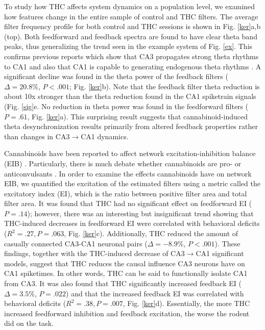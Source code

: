 \documentclass[11pt,a4paper,final]{article}
\begin{document}
To study how THC affects system dynamics on a population level, we examined how features change in the entire sample of control and THC filters.
The average filter frequency profile for both control and THC sessions is shown in Fig. \ref{ker}a,b (top).
Both feedforward and feedback spectra are found to have clear theta band peaks, thus generalizing the trend seen in the example system of Fig. \ref{ex}.
This confirms previous reports which show that CA3 propagates strong theta rhythms to CA1 \citep{kocsis99,buzsaki02} and also that CA1 is capable to generating endogenous theta rhythms \citep{williams09}.
A significant decline was found in the theta power of the feedback filters ($\Delta=20.8\%$, $P<.001$; Fig. \ref{ker}b).
Note that the feedback filter theta reduction is about 10x stronger than the theta reduction found in the CA1 spiketrain signals (Fig. \ref{sig}e.
No reduction in theta power was found in the feedforward filters ($P=.61$, Fig. \ref{ker}a).
This surprising result suggests that cannabinoid-induced theta desynchronization results primarily from altered feedback properties rather than changes in CA3$\to$CA1 dynamics.

Cannabinoids have been reported to affect network excitation-inhibition balance (EIB) \citep{ozaita12,monory15}.
Particularly, there is much debate whether cannabinoids are pro- or anticonvulsants \citep{hill13,turkanis82,clement03,blair06,rudenko12}.
In order to examine the effects cannabinoids have on network EIB, we quantified the excitation of the estimated filters using a metric called the excitatory index (EI), which is the ratio between positive filter area and total filter area.
It was found that THC had no significant effect on feedforward EI ($P=.14$); however, there was an interesting but insignificant trend showing that THC-induced decreases in feedforward EI were correlated with behavioral deficits ($R^2=.27, P=.063$, Fig. \ref{ker}c).
Additionally, THC reduced the amount of casually connected CA3-CA1 neuronal pairs ($\Delta=-8.9\%$, $P<.001$).
These findings, together with the THC-induced decrease of CA3$\to$CA1 significant models, suggest that THC reduces the causal influence CA3 neurons have on CA1 spiketimes.
In other words, THC can be said to functionally isolate CA1 from CA3.
It was also found that THC significantly increased feedback EI ($\Delta=3.5\%$, $P=.022$) and that the increased feedback EI was correlated with behavioral deficits ($R^2=.38, P=.007$, Fig. \ref{ker}d).
Essentially, the more THC increased feedforward inhibition and feedback excitation, the worse the rodent did on the task.
\end{document}
